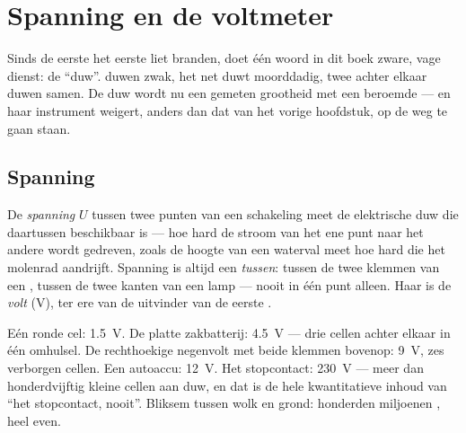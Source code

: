\chapter{Spanning en de voltmeter}\label{ch:g8:voltage-voltmeter}

Sinds de eerste  het eerste  liet
branden, doet één woord in dit boek zware, vage dienst: de ``duw''.
 duwen zwak, het net duwt moorddadig, twee  achter
elkaar duwen samen. De duw wordt nu een gemeten grootheid met een
beroemde  --- en haar instrument weigert, anders dan dat
van het vorige hoofdstuk, op de weg te gaan staan.

\section{Spanning}

\begin{definition}[Spanning]\label{def:g8:voltage-voltmeter:voltage}
De \emph{spanning} $U$ tussen twee punten van een
schakeling meet de elektrische duw die daartussen beschikbaar is
--- hoe hard de stroom van het ene punt naar het andere wordt gedreven,
zoals de hoogte van een waterval meet hoe hard die het molenrad
aandrijft. Spanning is altijd een \emph{tussen}: tussen de twee
klemmen van een , tussen de twee kanten van een
lamp --- nooit in één punt alleen. Haar  is de
\emph{volt} (\unit{V}), ter ere van de uitvinder van de
eerste .
\end{definition}

\begin{example}\label{ex:g8:voltage-voltmeter:values}
Eén ronde cel: \qty{1.5}{V}. De platte zakbatterij: \qty{4.5}{V} ---
drie cellen achter elkaar in één omhulsel. De rechthoekige
negenvolt met beide klemmen bovenop: \qty{9}{V}, zes
verborgen cellen. Een autoaccu: \qty{12}{V}. Het stopcontact:
\qty{230}{V} --- meer dan honderdvijftig kleine cellen aan duw, en dat
is de hele kwantitatieve inhoud van ``het stopcontact, nooit''.
Bliksem tussen wolk en grond: honderden miljoenen
, heel even.
\end{example}

